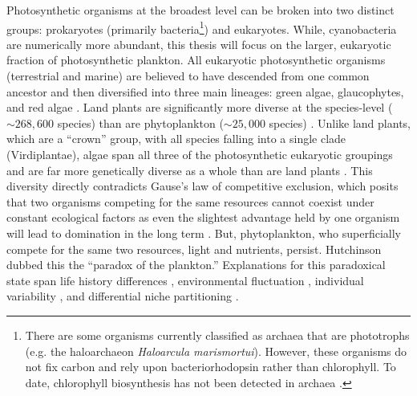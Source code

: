 Photosynthetic organisms at the broadest level can be broken into two distinct groups: prokaryotes (primarily bacteria\footnote{There are some organisms currently classified as archaea that are phototrophs (e.g. the haloarchaeon \textit{Haloarcula marismortui}). However, these organisms do not fix carbon and rely upon bacteriorhodopsin rather than chlorophyll. To date, chlorophyll biosynthesis has not been detected in archaea \citep{Bryant2006}.}) and eukaryotes. While, cyanobacteria are numerically more abundant, this thesis will focus on the larger, eukaryotic fraction of photosynthetic plankton. All eukaryotic photosynthetic organisms (terrestrial and marine) are believed to have descended from one common ancestor \citep{Margulis1971} and then diversified into three main lineages: green algae, glaucophytes, and red algae \citep{Falkowski2004}. Land plants are significantly more diverse at the species-level ($\sim268,600$ species) \citep{Chapman2009} than are phytoplankton ($\sim25,000$ species) \citep{Costello2013}. Unlike land plants, which are a ``crown'' group, with all species falling into a single clade (Virdiplantae), algae span all three of the photosynthetic eukaryotic groupings and are far more genetically diverse as a whole than are land plants \citep{Falkowski2004}. This diversity directly contradicts Gause's law of competitive exclusion, which posits that two organisms competing for the same resources cannot coexist under constant ecological factors as even the slightest advantage held by one organism will lead to domination in the long term \citep{Hardin1960}. But, phytoplankton, who superficially compete for the same two resources, light and nutrients, persist. Hutchinson \citeyearpar{Hutchinson1961} dubbed this the ``paradox of the plankton.'' Explanations for this paradoxical state span life history differences \citep{Huisman2001}, environmental fluctuation \citep{Roy2007}, individual variability \citep{Menden-deuer2014}, and differential niche partitioning \citep{Connel1980}. \par

